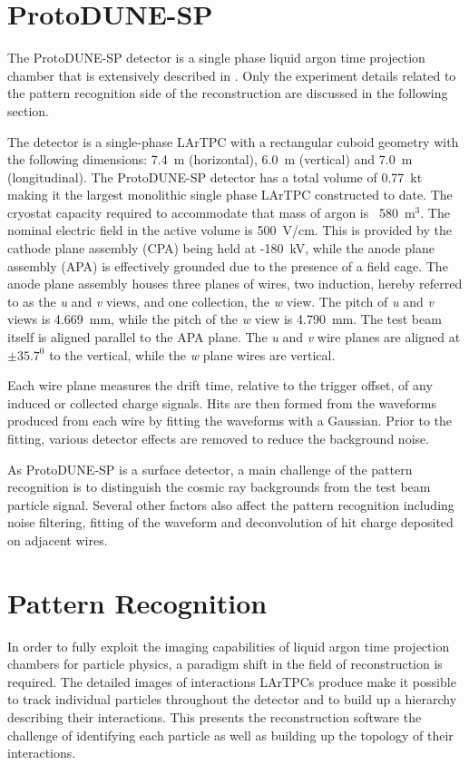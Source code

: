 \section{ProtoDUNE-SP}
\label{sec:protodunesp}
The ProtoDUNE-SP detector is a single phase liquid argon time projection chamber that is extensively described in \cite{pdtdr}.  Only the experiment details related to the pattern recognition side of the reconstruction are discussed in the following section.

The detector is a single-phase LArTPC with a rectangular cuboid geometry with the following dimensions: 7.4~m (horizontal), 6.0~m (vertical) and 7.0~m (longitudinal).  The ProtoDUNE-SP detector has a total volume of 0.77~kt making it the largest monolithic single phase LArTPC constructed to date.  The cryostat capacity required to accommodate that mass of argon is ~580~$\text{m}^{3}$.  The nominal electric field in the active volume is 500~V/cm.  This is provided by the cathode plane assembly (CPA) being held at -180~kV, while the anode plane assembly (APA) is effectively grounded due to the presence of a field cage.  The anode plane assembly houses three planes of wires, two induction, hereby referred to as the \textit{u} and \textit{v} views, and one collection, the \textit{w} view.  The pitch of \textit{u} and \textit{v} views is 4.669~mm, while the pitch of the \textit{w} view is 4.790~mm.  The test beam itself is aligned parallel to the APA plane.  The \textit{u} and \textit{v} wire planes are aligned at $\pm 35.7^{0}$ to the vertical, while the \textit{w} plane wires are vertical.  

Each wire plane measures the drift time, relative to the trigger offset, of any induced or collected charge signals.  Hits are then formed from the waveforms produced from each wire by fitting the waveforms with a Gaussian.  Prior to the fitting, various detector effects are removed to reduce the background noise.  

As ProtoDUNE-SP is a surface detector, a main challenge of the pattern recognition is to distinguish the cosmic ray backgrounds from the test beam particle signal.  Several other factors also affect the pattern recognition including noise filtering, fitting of the waveform and deconvolution of hit charge deposited on adjacent wires.  

\section{Pattern Recognition}
\label{sec:patrec}
In order to fully exploit the imaging capabilities of liquid argon time projection chambers for particle physics, a paradigm shift in the field of reconstruction is required.  The detailed images of interactions LArTPCs produce make it possible to track individual particles throughout the detector and to build up a hierarchy describing their interactions.  This presents the reconstruction software the challenge of identifying each particle as well as building up the topology of their interactions.

